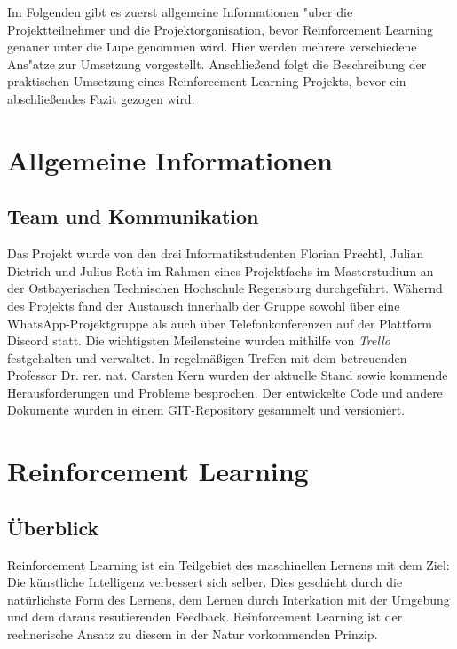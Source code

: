 \documentclass[12pt,a4paper]{article}
\begin{document}
Im Folgenden gibt es zuerst allgemeine Informationen "uber die Projektteilnehmer und die Projektorganisation, bevor Reinforcement Learning genauer unter die Lupe genommen wird.
Hier werden mehrere verschiedene Ans"atze zur Umsetzung vorgestellt.
Anschließend folgt die Beschreibung der praktischen Umsetzung eines Reinforcement Learning Projekts, bevor ein abschließendes Fazit gezogen wird.

\newpage


\section{Allgemeine Informationen}
\subsection{Team und Kommunikation}
Das Projekt wurde von den drei Informatikstudenten Florian Prechtl, Julian Dietrich und Julius Roth im Rahmen eines Projektfachs im Masterstudium an der Ostbayerischen Technischen Hochschule Regensburg durchgef\"uhrt.
W\"ahernd des Projekts fand der Austausch innerhalb der Gruppe sowohl \"uber eine WhatsApp-Projektgruppe als auch \"uber Telefonkonferenzen auf der Plattform Discord statt.
Die wichtigsten Meilensteine wurden mithilfe von \textit{Trello} festgehalten und verwaltet.
In regelm\"aßigen Treffen mit dem betreuenden Professor Dr. rer. nat. Carsten Kern wurden der aktuelle Stand sowie kommende Herausforderungen und Probleme besprochen.
Der entwickelte Code und andere Dokumente wurden in einem GIT-Repository gesammelt und versioniert.

\newpage





\section{Reinforcement Learning}
\subsection{Überblick}
Reinforcement Learning ist ein Teilgebiet des maschinellen Lernens mit dem Ziel: Die k\"unstliche Intelligenz verbessert sich selber.
Dies geschieht durch die nat\"urlichste Form des Lernens, dem Lernen durch Interkation mit der Umgebung und dem daraus resutierenden Feedback.
Reinforcement Learning ist der rechnerische Ansatz zu diesem in der Natur vorkommenden Prinzip.
\end{document}
